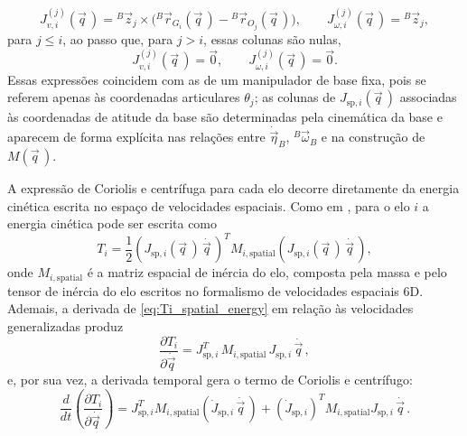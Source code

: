 \begin{equation}
    J_{v,i}^{(j)}(\vec q\, )
    =
    {}^{B}\!\vec z_j \times
    \bigl({}^{B}\!\vec r_{G_i}(\vec q\, ) - {}^{B}\!\vec r_{O_j}(\vec q\, )\bigr),
    \qquad
    J_{\omega,i}^{(j)}(\vec q\, )
    =
    {}^{B}\!\vec z_j,
\end{equation}
para $j\le i$, ao passo que, para $j>i$, essas colunas são nulas,
\begin{equation}
J_{v,i}^{(j)}(\vec q\, ) = \vec 0,
\qquad
J_{\omega,i}^{(j)}(\vec q\, ) = \vec 0.
\end{equation}
Essas expressões coincidem com as de um manipulador de base fixa, pois se
referem apenas às coordenadas articulares $\theta_j$; as colunas de
$J_{\text{sp},i}(\vec q\, )$ associadas às coordenadas de atitude da base são
determinadas pela cinemática da base e aparecem de forma explícita nas
relações entre $\dot{\vec\eta}_B$, ${}^{B}\!\vec\omega_B$ e na construção de
$M(\vec q\, )$.


A expressão de Coriolis e centrífuga para cada elo decorre diretamente da
energia cinética escrita no espaço de velocidades espaciais.
Como em \cite{featherstone2008}, para o elo $i$ a energia cinética pode ser
escrita como
\begin{equation}
T_i
=
\frac{1}{2}
\left(
J_{\text{sp},i}(\vec q\, )\,\dot{\vec q\, }
\right)^{T}
M_{i,\text{spatial}}
\left(
J_{\text{sp},i}(\vec q\, )\,\dot{\vec q\, }
\right),
\label{eq:Ti_spatial_energy}
\end{equation}
onde $M_{i,\text{spatial}}$ é a matriz espacial de
inércia do elo, composta pela massa e pelo tensor de inércia do elo escritos no
formalismo de velocidades espaciais 6D.
Ademais, a derivada de \eqref{eq:Ti_spatial_energy} em relação às velocidades generalizadas produz
\begin{equation}
\frac{\partial T_i}{\partial \dot{\vec q\, }}
=
J_{\text{sp},i}^{T}\,
M_{i,\text{spatial}}\,
J_{\text{sp},i}\,\dot{\vec q\, },
\end{equation}
e, por sua vez, a derivada temporal gera o termo de Coriolis e centrífugo:
\begin{equation}
\frac{d}{dt}
\left(
\frac{\partial T_i}{\partial \dot{\vec q\, }}
\right)
=
J_{\text{sp},i}^{T}
M_{i,\text{spatial}}
\left(
\dot J_{\text{sp},i}\,\dot{\vec q\, }
\right)
+
\left(\dot J_{\text{sp},i}\right)^{T}
M_{i,\text{spatial}}
J_{\text{sp},i}\,\dot{\vec q\, }.
\label{eq:derivada_spatial}
\end{equation}

